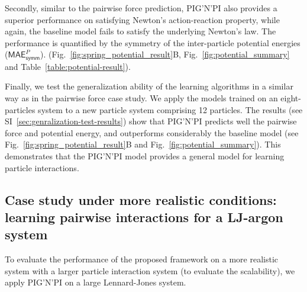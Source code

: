 \documentclass{article}
\newcommand{\pignpi}{PIG'N'PI\xspace}
\newcommand{\APPENDIX}{SI} %
\begin{document}
Secondly, similar to the pairwise force prediction, \pignpi also provides a superior performance on satisfying Newton's action-reaction property, while again, the baseline model fails to satisfy the underlying Newton's law. The performance is quantified by the symmetry of the inter-particle potential energies ($\textsf{MAE}_\textsf{symm}^{P}$).  (Fig.~\ref{fig:spring_potential_result}B, Fig.~\ref{fig:potential_summary} and Table~\ref{table:potential-result}).    






Finally, we test the generalization ability of the learning algorithms in a similar way as in the pairwise force case study. We apply the  models trained on an eight-particles system to a new particle system comprising 12 particles. The results (see \APPENDIX~\ref{sec:genralization-test-results}) show that \pignpi predicts well the pairwise force and potential energy, and outperforms considerably the baseline model (see Fig.~\ref{fig:spring_potential_result}B and Fig.~\ref{fig:potential_summary}). This demonstrates that the \pignpi model provides a general model for learning particle interactions. 

\subsection{Case study under more realistic conditions: learning pairwise interactions for a LJ-argon system}
\label{sec:results_pignpi_vs_baseline_LJ_argon}
To evaluate the performance of the proposed framework on a more realistic system with a larger particle interaction system (to evaluate the scalability), we apply \pignpi on a large Lennard-Jones system.
\end{document}
